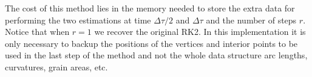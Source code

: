 The cost of this method lies in the memory needed to store the extra data for performing the two estimations at time $\Delta \tau/2$ and $\Delta \tau$ and the number of steps $r$. Notice that when $r = 1$  we recover the original RK2. In this implementation it is only necessary to backup the positions of the vertices and interior points to be used in the last step of the method and not the whole data structure \ie arc lengths, curvatures, grain areas, etc.

